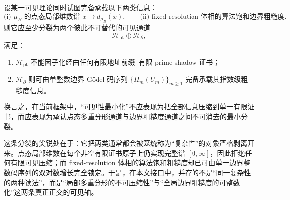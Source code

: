 \begin{conjecture}\label{conj:conclusion-zg-minimal-two-channel-visibility}
设某一可见理论同时试图完备承载以下两类信息：
\[
\text{(i) }\mu_B\text{ 的点态局部维数谱 }x\mapsto d_{\mu_B}(x),
\qquad
\text{(ii) fixed-resolution 体相的算法饱和边界粗糙度}.
\]
则它应至少分裂为两个彼此不可替代的可见通道
\[
\mathcal H_{\mathrm{pt}}\oplus \mathcal H_{\partial},
\]
满足：
\begin{enumerate}
  \item \(\mathcal H_{\mathrm{pt}}\) 不能因子化经由任何有限地址前缀--有限 prime shadow 证书；
  \item \(\mathcal H_{\partial}\) 则可由单整数边界 Gödel 码序列 \(\{H_m(U_m)\}_{m\ge 1}\) 完备承载其指数级粗糙度信息。
\end{enumerate}
换言之，在当前框架中，“可见性最小化”不应表现为把全部信息压缩到单一有限证书，而应表现为承认点态多重分形通道与边界粗糙度通道之间不可消去的最小分裂。
\end{conjecture}

\noindent
这条分裂的尖锐处在于：它把两类通常都会被笼统称为“复杂性”的对象严格剥离开来。点态局部维数在每个非空有限证书原子上仍实现完整谱 \([0,\infty]\)，因此拒绝任何有限可见压缩；而 fixed-resolution 体相的算法饱和粗糙度却已可由单一边界整数码序列的双对数增长完全锁定。于是，在本文接口中，并存的不是“同一复杂性的两种读法”，而是“局部多重分形的不可压缩性”与“全局边界粗糙度的可整数化”这两条真正正交的可见轴。

\endinput
